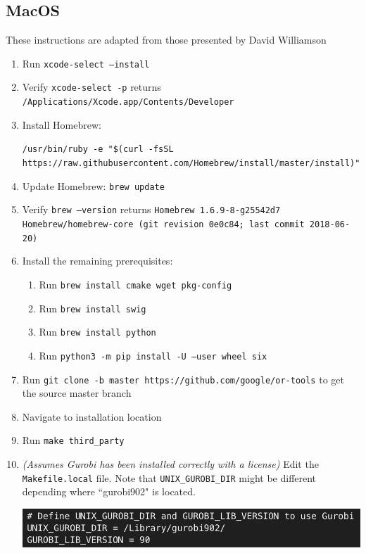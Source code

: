 \documentclass[11 pt]{article}
\newcommand{\code}[1]{\colorbox{gray!10}{\textcolor{black!85}{\texttt{#1}}}}
\begin{document}
\subsection{MacOS}
These instructions are adapted from those presented by David Williamson
\begin{enumerate}
\item Run \code{xcode-select --install} 
\item Verify \code{xcode-select -p} returns \code{/Applications/Xcode.app/Contents/Developer}
\item Install Homebrew: \newline
\begin{small} \code{/usr/bin/ruby -e "\$(curl -fsSL https://raw.githubusercontent.com/Homebrew/install/master/install)"} \end{small}
\item Update Homebrew: \code{brew update}
\item Verify \code{brew --version} returns \newline
\code{Homebrew 1.6.9-8-g25542d7} \newline
\code{Homebrew/homebrew-core (git revision 0e0c84; last commit 2018-06-20)}
\item Install the remaining prerequisites:
\begin{enumerate}
\item Run \code{brew install cmake wget pkg-config}
\item Run \code{brew install swig}
\item Run \code{brew install python}
\item Run \code{python3 -m pip install -U --user wheel six}
\end{enumerate} 
\item Run \code{git clone -b master https://github.com/google/or-tools} to get the source master branch
\item Navigate to installation location
\item Run \code{make third\_party}
\item \textit{(Assumes Gurobi has been installed correctly with a license)} Edit the \texttt{Makefile.local} file. Note that \texttt{UNIX\_GUROBI\_DIR} might be different depending where ``gurobi902" is located. 
\begin{center}
\includegraphics[scale=0.7]{MakefileMac.png}

\end{center}
\end{enumerate}
\end{document}

